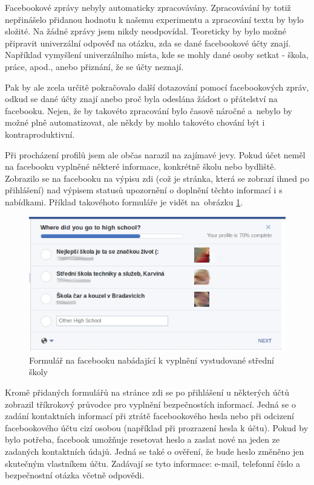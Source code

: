 \documentclass[thesis=M,czech]{FITthesis}[2013/05/10]
\begin{document}
Facebookové zprávy nebyly automaticky zpracovávány. Zpracovávání by totiž nepřinášelo přidanou hodnotu k našemu experimentu a zpracování textu by bylo složité. Na žádné zprávy jsem nikdy neodpovídal. Teoreticky by bylo možné připravit univerzální odpověď na otázku, zda se dané facebookové účty znají. Například vymyšlení univerzálního místa, kde se mohly dané osoby setkat - škola, práce, apod., anebo přiznání, že se účty neznají. 

Pak by ale zcela určitě pokračovalo další dotazování pomocí facebookových zpráv, odkud se dané účty znají anebo proč byla odeslána žádost o přátelství na facebooku. Nejen, že by takovéto zpracování bylo časově náročné a~nebylo by možné plně automatizovat, ale někdy by mohlo takovéto chování být i kontraproduktivní.

Při procházení profilů jsem ale občas narazil na zajímavé jevy. Pokud účet neměl na facebooku vyplněné některé informace, konkrétně školu nebo bydliště. Zobrazilo se na facebooku na výpisu zdi (což je stránka, která se zobrazí ihned po přihlášení) nad výpisem statusů upozornění o doplnění těchto informací i s nabídkami. Příklad takovéhoto formuláře je vidět na~obrázku \ref{fig:completeSchool}.

\begin{figure}[h]
\begin{center}
\includegraphics[width=5in]{figures/completeSchool.png}
\caption{Formulář na facebooku nabádající k vyplnění vystudované střední školy}
\label{fig:completeSchool}
\end{center}
\end{figure}

Kromě přidaných formulářů na stránce zdi se po přihlášení u některých účtů zobrazil tříkrokový průvodce pro vyplnění bezpečnostích informací. Jedná se o zadání kontaktních informací při ztrátě facebookového hesla nebo při odcizení facebookového účtu cizí osobou (například při prozrazení hesla k účtu). Pokud by bylo potřeba, facebook umožňuje resetovat heslo a zaslat nové na jeden ze zadaných kontaktních údajů. Jedná se také o ověření, že bude heslo změněno jen skutečným vlastníkem účtu. Zadávají se tyto informace: e-mail, telefonní číslo a bezpečnostní otázka včetně odpovědi. 
\end{document}
